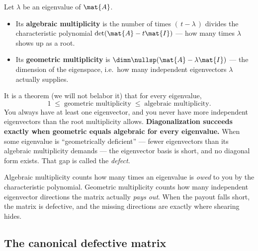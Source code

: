 \begin{definition}
\label{ch28:def-mult}
Let $\lambda$ be an eigenvalue of $\mat{A}$.
\begin{itemize}
\item Its \textbf{algebraic multiplicity} is the number of times $(\,t-\lambda\,)$ divides
  the characteristic polynomial $\det(\mat{A}-t\mat{I})$ --- how many times $\lambda$
  shows up as a root.
\item Its \textbf{geometric multiplicity} is $\dimn\nullsp(\mat{A}-\lambda\mat{I})$ ---
  the dimension of the eigenspace, i.e.\ how many independent eigenvectors $\lambda$
  actually supplies.
\end{itemize}
\end{definition}

It is a theorem (we will not belabor it) that for every eigenvalue,
\[
1 \;\le\; \text{geometric multiplicity} \;\le\; \text{algebraic multiplicity}.
\]
You always have at least one eigenvector, and you never have more independent
eigenvectors than the root multiplicity allows. \textbf{Diagonalization succeeds exactly
when geometric equals algebraic for every eigenvalue.} When some eigenvalue is
``geometrically deficient'' --- fewer eigenvectors than its algebraic multiplicity
demands --- the eigenvector basis is short, and no diagonal form exists. That gap is
called the \emph{defect}.

\begin{intuitionbox}
Algebraic multiplicity counts how many times an eigenvalue is \emph{owed} to you by the
characteristic polynomial. Geometric multiplicity counts how many independent
eigenvector directions the matrix actually \emph{pays out}. When the payout falls short,
the matrix is defective, and the missing directions are exactly where shearing hides.
\end{intuitionbox}

\subsection{The canonical defective matrix}

